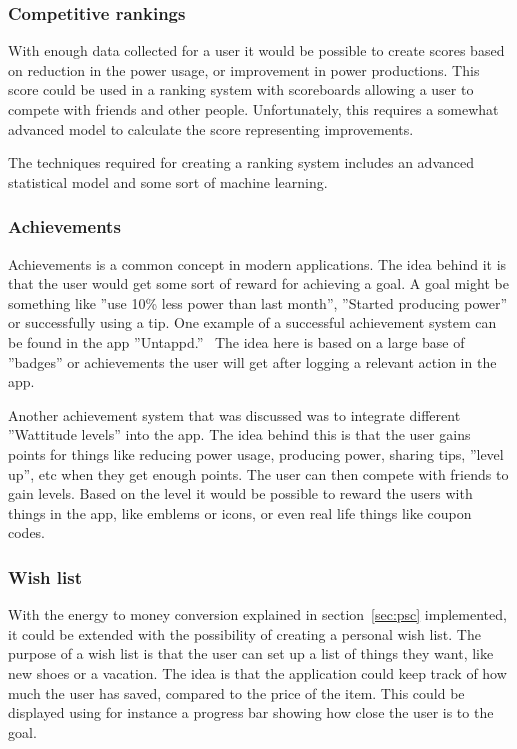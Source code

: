 \subsubsection{Competitive rankings}
With enough data collected for a user it would be possible to create scores based on reduction in the power usage, or improvement in power productions. This score could be used in a ranking system with scoreboards allowing a user to compete with friends and other people. Unfortunately, this requires a somewhat advanced model to calculate the score representing improvements.

The techniques required for creating a ranking system includes an advanced statistical model and some sort of machine learning. 

\subsubsection{Achievements}
Achievements is a common concept in modern applications. The idea behind it is that the user would get some sort of reward for achieving a goal. A goal might be something like ''use 10\% less power than last month'', ''Started producing power'' or successfully using a tip.
One example of a successful achievement system can be found in the app ''Untappd.''~\cite{untappd}
The idea here is based on a large base of ''badges'' or achievements the user will get after logging a relevant action in the app. 

Another achievement system that was discussed was to integrate different ''Wattitude levels'' into the app. The idea behind this is that the user gains points for things like reducing power usage, producing power, sharing tips, ''level up'', etc when they get enough points. The user can then compete with friends to gain levels. Based on the level it would be possible to reward the users with things in the app, like emblems or icons, or even real life things like coupon codes.

\subsubsection{Wish list}
With the energy to money conversion explained in section~\ref{sec:psc} implemented, it could be extended with the possibility of creating a personal wish list. 
The purpose of a wish list is that the user can set up a list of things they want, like new shoes or a vacation. The idea is that the application could keep track of how much the user has saved, compared to the price of the item. This could be displayed using for instance a progress bar showing how close the user is to the goal.

